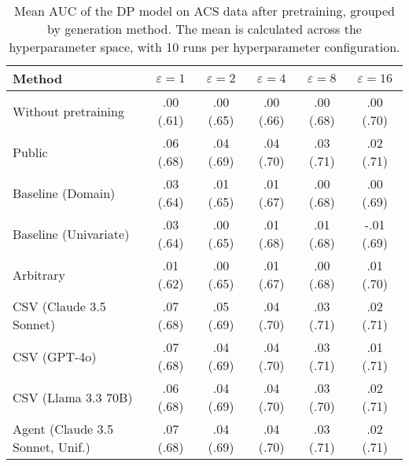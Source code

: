 \begin{table}[h!]
    \centering
    \caption{Mean AUC of the DP model on ACS data after pretraining, grouped by generation method. The mean is calculated across the hyperparameter space, with 10 runs per hyperparameter configuration.}
    \label{tab:epsilon_comparison}
    \begin{tabular}{lccccc}
    \toprule
    Method & $\varepsilon=1$ & $\varepsilon=2$ & $\varepsilon=4$ & $\varepsilon=8$ & $\varepsilon=16$ \\
    \midrule
    Without pretraining & .00 {\small (.61)} & .00 {\small (.65)} & .00 {\small (.66)} & .00 {\small (.68)} & .00 {\small (.70)} \\
    \arrayrulecolor{black!50!}\midrule
    Public & .06 {\small (.68)} & .04 {\small (.69)} & .04 {\small (.70)} & .03 {\small (.71)} & \cellcolor{gold!30}.02 {\small (.71)} \\
    \arrayrulecolor{black!50!}\midrule
    Baseline (Domain) & .03 {\small (.64)} & .01 {\small (.65)} & .01 {\small (.67)} & .00 {\small (.68)} & .00 {\small (.69)} \\
    Baseline (Univariate) & .03 {\small (.64)} & .00 {\small (.65)} & .01 {\small (.68)} & .01 {\small (.68)} & -.01 {\small (.69)} \\
    \arrayrulecolor{black!50!}\midrule
    Arbitrary & .01 {\small (.62)} & .00 {\small (.65)} & .01 {\small (.67)} & .00 {\small (.68)} & .01 {\small (.70)} \\
    \arrayrulecolor{black!50!}\midrule
    CSV (Claude 3.5 Sonnet) & \cellcolor{silver!30}.07 {\small (.68)} & \cellcolor{gold!30}.05 {\small (.69)} & \cellcolor{silver!30}.04 {\small (.70)} & \cellcolor{gold!30}.03 {\small (.71)} & \cellcolor{silver!30}.02 {\small (.71)} \\
    CSV (GPT-4o) & \cellcolor{gold!30}.07 {\small (.68)} & \cellcolor{silver!30}.04 {\small (.69)} & \cellcolor{gold!30}.04 {\small (.70)} & \cellcolor{silver!30}.03 {\small (.71)} & \cellcolor{bronze!30}.01 {\small (.71)} \\
    CSV (Llama 3.3 70B) & .06 {\small (.68)} & \cellcolor{bronze!30}.04 {\small (.69)} & \cellcolor{bronze!30}.04 {\small (.70)} & .03 {\small (.70)} & \cellcolor{gold!30}.02 {\small (.71)} \\
    \arrayrulecolor{black!50!}\midrule
    Agent (Claude 3.5 Sonnet, Unif.) & \cellcolor{silver!30}.07 {\small (.68)} & \cellcolor{silver!30}.04 {\small (.69)} & \cellcolor{silver!30}.04 {\small (.70)} & \cellcolor{bronze!30}.03 {\small (.71)} & \cellcolor{silver!30}.02 {\small (.71)} \\

\end{tabular}
\end{table}
